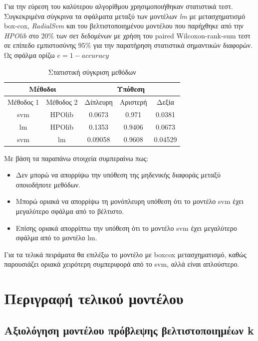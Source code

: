 \documentclass[]{article}
\numberwithin{equation}{section}		%
\numberwithin{figure}{section}			%
\numberwithin{table}{section}				%
\begin{document}
   Για την εύρεση του καλύτερου αλγορίθμου χρησιμοποιήθηκαν στατιστικά τεστ. Συγκεκριμένα σύγκρινα τα σφάλματα μεταξύ των μοντέλων \textit{lm} με μετασχηματισμό box-cox, \textit{RadialSvm} και του βελτιστοποιημένου μοντέλου που παρήχθηκε από την \textit{HPOlib} στο 20$\%$ των σετ δεδομένων με χρήση του paired Wilcoxon-rank-sum τεστ σε επίπεδο εμπιστοσύνης $95\%$ για την παρατήρηση στατιστικά σημαντικών διαφορών. Ως σφάλμα ορίζω $e = 1 - accuracy$
   
   \begin{table}[!htb]
   	\begin{center}
   		\begin{tabular}{*5c}
   			\toprule
   			\multicolumn{2}{c}{Μέθοδοι} & \multicolumn{3}{c}{Υπόθεση} \\ 
   			\midrule
   			Μέθοδος 1 & Μέθοδος 2 & Δίπλευρη & Αριστερή & Δεξία\\
   			\midrule
   			svm & HPOlib & 0.0673 & 0.971 & 0.0381 \\
   			lm & HPOlib & 0.1353 & 0.9406 & 0.0673 \\
   			svm & lm & 0.09058 & 0.9608 & 0.04529 \\
   			\midrule   				
   		\end{tabular}    
   	\end{center}
   	\caption{Στατιστική σύγκριση μεθόδων}\label{mfs}
   \end{table}
   
   Με βάση τα παραπάνω στοιχεία συμπεραίνω πως:
   \begin{itemize}
   	\item Δεν μπορώ να απορρίψω την υπόθεση της μηδενικής διαφοράς μεταξύ οποιοδήποτε μεθόδων.
   	\item Μπορώ οριακά να απορρίψω τη μονόπλευρη υπόθεση ότι το μοντέλο svm έχει μεγαλύτερο σφάλμα από το βέλτιστο.
   	\item Επίσης οριακά απορρίπτω την υπόθεση ότι το μοντέλο svm έχει μεγαλύτερο σφάλμα από το μοντέλο lm.
   \end{itemize}
   
   Για τα τελικά πειράματα θα επιλέξω το μοντέλο με boxcox μετασχηματισμό, καθώς παρουσιάζει οριακά χειρότερη συμπεριφορά από το svm, αλλά είναι απλούστερο.
   
   \section{Περιγραφή τελικού μοντέλου}
   
   \subsection{Αξιολόγηση μοντέλου πρόβλεψης βελτιστοποιημέων k}
   
\end{document}
